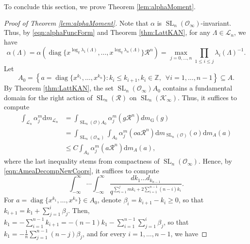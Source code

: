 \documentclass[11pt,a4paper,reqno]{amsart}
\theoremstyle{definition}
\theoremstyle{remark}
\numberwithin{equation}{section}
\begin{document}
To conclude this section, we prove Theorem \ref{lem:alphaMoment}.
\begin{proof}[Proof of Theorem \ref{lem:alphaMoment}]
    Note that $\alpha$ is $\operatorname{SL}_n(\mathcal{O}_{\infty})$-invariant. Thus, by \eqref{eqn:alphaFuncForm} and Theorem \ref{thm:LattKAN}, for any $\Lambda\in \mathcal{L}_n$, we have
    \begin{equation}
    \label{eqn:alphaCompDiag}
    \alpha(\Lambda)=\alpha\left(\operatorname{diag}\{x^{\log_q\lambda_1(\Lambda)},\dots,x^{\log_q\lambda_n(\Lambda)}\}\mathcal{R}^n\right)=\max_{j=0,\dots,n}\prod_{1\leq i\leq j}\lambda_i(\Lambda)^{-1}.\end{equation}
    Let 
    $$A_0=\left\{a=\operatorname{diag}\{x^{k_1},\dots,x^{k_n}\}: k_i\leq k_{i+1},k_i\in \mathbb{Z},\,\,\,\forall i=1,\dots,n-1\right\}\subseteq A.$$
     By Theorem \ref{thm:LattKAN}, the set $\operatorname{SL}_n(\mathcal{O}_{\infty})A_0$ contains a fundamental domain for the right action of $\operatorname{SL}_n(\mathcal{R})$ on $\operatorname{SL}_n(\mathcal{K}_{\infty})$. 
    Thus, it suffices to compute
    \begin{equation}
    \label{eqn:IntDecAlpha}
    \begin{split}
    \int_{\mathcal{L}_n}\alpha_j^m\mathrm{d}m_{\mathcal{L}_n}&=\int_{\operatorname{SL}_n(\mathcal{O})A_0}\alpha_j^m(g\mathcal{R}^n)dm_{\mathrm{G}}(g)\\
 &=\int_{\operatorname{SL}_n(\mathcal{O}_{\infty})}\int_{A_0}\alpha_j^m(oa\mathcal{R}^n)\mathrm{d}m_{\operatorname{SL}_n(\mathcal{O})}(o)\mathrm{d}m_A(a)\\
    &\leq C\int_{A_{0}}\alpha_j^m(a\mathcal{R}^n)\mathrm{d}m_A(a),
    \end{split}
    \end{equation}
    where the last inequality stems from compactness of $\operatorname{SL}_n(\mathcal{O}_{\infty})$. Hence, by \eqref{eqn:AmeaDecompNewCoors}, it suffices to compute
    \begin{equation}
    \label{eqn:alphaAInteg}
        \int_{-\infty}^{\infty}\cdots\int_{-\infty}^{\infty}\frac{dk_1\dots d_{k_{n-1}}}{q^{\sum_{i=1}^jmk_i+2\sum_{i=1}^{n-1}(n-i)k_i}}.
    \end{equation}
    For $a=\operatorname{diag}\{x^{k_1},\dots,x^{k_n}\}\in A_0$, denote $\beta_i=k_{i+1}-k_i\geq 0$, so that $k_{i+1}=k_1+\sum_{j=1}^i\beta_j$. Then, $k_1=-\sum_{i=1}^{n-1}k_{i+1}=-(n-1)k_1-\sum_{i=1}^{n-1}\sum_{j=1}^i\beta_j$, so that $k_1=-\frac{1}{n}\sum_{j=1}^{n-1}(n-j)\beta_j$, and for every $i=1,\dots,n-1$, we have 

\end{proof}
\end{document}
